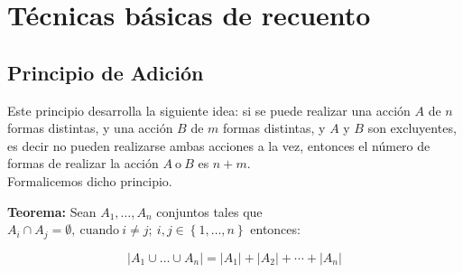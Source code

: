 \documentclass[12pt]{article}
\theoremstyle{definition}
\theoremstyle{plain}
\theoremstyle{plain}
\theoremstyle{definition}
\begin{document}
\section{Técnicas básicas de recuento}

    \subsection{Principio de Adición}

        Este principio desarrolla la siguiente idea: si se puede realizar una acción \(A\) de \(n\) formas distintas, y una acción \(B\) de \(m\) formas distintas, y \(A\) y \(B\) son excluyentes, es decir no pueden realizarse ambas acciones a la vez, entonces el número de formas de realizar la acción \(A\ \text{o}\ B\) es \(n+m\).\\
        Formalicemos dicho principio.

        \textbf{Teorema:}
        Sean \(A_1, \dots, A_n\) conjuntos tales que \(A_i \cap A_j = \emptyset,\ \text{cuando}\ i \neq j;\ i,j \in \left\{1,\dots,n\right\}\) entonces:

        \begin{equation*}
            \left|A_1 \cup \dots \cup A_n\right| = \left|A_1\right| + \left|A_2\right| + \cdots + \left|A_n\right|
        \end{equation*}

\end{document}
